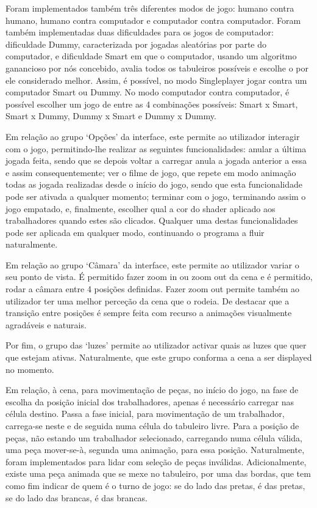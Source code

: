 \documentclass[a4paper]{article}
\begin{document}
Foram implementados também três diferentes modos de jogo: humano contra humano, humano contra computador e computador contra computador. Foram também implementadas duas dificuldades para os jogos de computador: dificuldade Dummy, caracterizada por jogadas aleatórias por parte do computador, e dificuldade Smart em que o computador, usando um algoritmo ganancioso por nós concebido, avalia todos os tabuleiros possíveis e escolhe o por ele considerado melhor.  Assim, é possível, no modo Singleplayer jogar contra um computador Smart ou Dummy. No modo computador contra computador, é possível escolher um jogo de entre as 4 combinações possíveis: Smart x Smart, Smart x Dummy, Dummy x Smart e Dummy x Dummy.

Em relação ao grupo ‘Opções’ da interface, este permite ao utilizador interagir com o jogo, permitindo-lhe realizar as seguintes funcionalidades: anular a última jogada feita, sendo que se depois voltar a carregar anula a jogada anterior a essa e assim consequentemente; ver o filme de jogo, que repete em modo animação todas as jogada realizadas desde o início do jogo, sendo que esta funcionalidade pode ser ativada a qualquer momento; terminar com o jogo, terminando assim o jogo empatado, e, finalmente, escolher qual a cor do shader aplicado aos trabalhadores quando estes são clicados. Qualquer uma destas funcionalidades pode ser aplicada em qualquer modo, continuando o programa a fluir naturalmente.

Em relação ao grupo ‘Câmara’ da interface, este permite ao utilizador variar o seu ponto de vista. É permitido fazer zoom in  ou zoom out da cena e é permitido, rodar a câmara entre 4 posições definidas. Fazer zoom out permite também ao utilizador ter uma melhor perceção da cena que o rodeia. De destacar que a transição entre posições é sempre feita com recurso a animações visualmente agradáveis e naturais.

Por fim, o grupo das ‘luzes’ permite ao utilizador activar quais as luzes que quer que estejam ativas. Naturalmente, que este grupo conforma a cena a ser displayed no momento.

Em relação, à cena, para movimentação de peças, no início do jogo, na fase de escolha da posição inicial dos trabalhadores, apenas é necessário carregar nas célula destino. Passa a fase inicial, para movimentação de um trabalhador, carrega-se neste e de seguida numa célula do tabuleiro livre. Para a posição de peças, não estando um trabalhador selecionado, carregando numa célula válida, uma peça mover-se-à, segunda uma animação, para essa posição. Naturalmente, foram implementados para lidar com seleção de peças inválidas.
Adicionalmente, existe uma peça animada que se mexe no tabuleiro, por uma das bordas, que tem como fim indicar de quem é o turno de jogo: se do lado das pretas, é das pretas, se do lado das brancas, é das brancas.
\end{document}
